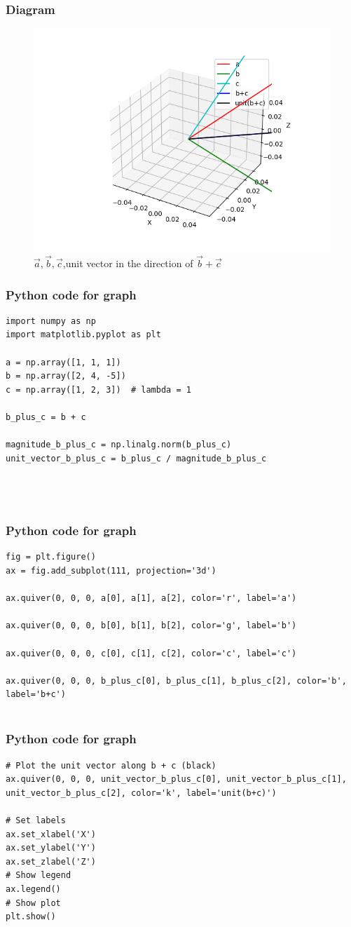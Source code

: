 \documentclass{beamer}
\begin{document}
\begin{frame}
\frametitle{Diagram}
\begin{figure}[h!]
	\centering
	\includegraphics[width=0.5\linewidth]{figs/Figure_1.png}
	\caption{ $\vec{a},\vec{b},\vec{c}$,unit vector in the direction of  $\vec{b}+\vec{c}$}
	\label{stemplot}
\end{figure}	

\end{frame}
\begin{frame}[fragile]
\frametitle{Python code for graph}
\begin{lstlisting}[style=pythonstyle]
import numpy as np
import matplotlib.pyplot as plt

a = np.array([1, 1, 1])
b = np.array([2, 4, -5])
c = np.array([1, 2, 3])  # lambda = 1

b_plus_c = b + c

magnitude_b_plus_c = np.linalg.norm(b_plus_c)
unit_vector_b_plus_c = b_plus_c / magnitude_b_plus_c




\end{lstlisting}
\end{frame}
\begin{frame}[fragile]
\frametitle{Python code for graph}
\begin{lstlisting}[style=pythonstyle]
fig = plt.figure()
ax = fig.add_subplot(111, projection='3d')

ax.quiver(0, 0, 0, a[0], a[1], a[2], color='r', label='a')

ax.quiver(0, 0, 0, b[0], b[1], b[2], color='g', label='b')

ax.quiver(0, 0, 0, c[0], c[1], c[2], color='c', label='c')

ax.quiver(0, 0, 0, b_plus_c[0], b_plus_c[1], b_plus_c[2], color='b', label='b+c')


\end{lstlisting}
\end{frame}
\begin{frame}[fragile]
\frametitle{Python code for graph}
\begin{lstlisting}[style=pythonstyle]
# Plot the unit vector along b + c (black)
ax.quiver(0, 0, 0, unit_vector_b_plus_c[0], unit_vector_b_plus_c[1], unit_vector_b_plus_c[2], color='k', label='unit(b+c)')

# Set labels
ax.set_xlabel('X')
ax.set_ylabel('Y')
ax.set_zlabel('Z')
# Show legend
ax.legend()
# Show plot
plt.show()
\end{lstlisting}
\end{frame}
\end{document}
